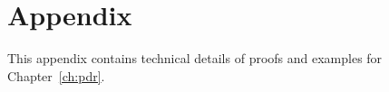 
\chapter{Appendix}\label{ch:app:pdr}
This appendix contains technical details of proofs and examples for Chapter~\ref{ch:pdr}.
\fromhere
